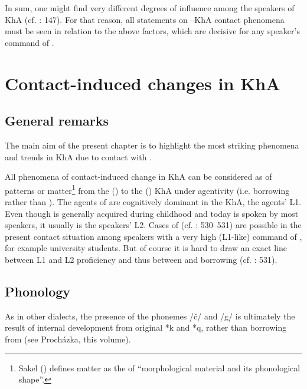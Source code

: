 \documentclass[output=paper,nonflat]{langsci/langscibook}
\begin{document}
In sum, one might find very different degrees of  influence among the speakers of KhA (cf. \citealt{MatrasShabibi2007}: 147). For that reason, all statements on –KhA contact phenomena must be seen in relation to the above factors, which are decisive for any speaker’s command of . 
\largerpage

\section{Contact-induced changes in KhA} 
\subsection{General remarks\footnotemark}
The main aim of the present chapter is to highlight the most striking phenomena and trends in KhA  due to contact with .


All phenomena of contact-induced change in KhA can be considered as  of patterns or matter\footnote{Sakel (\citeyear[15]{Sakel2007}) defines matter  as the  of “morphological material and its phonological shape”.} from the  ()  to the  () KhA under  agentivity (i.e. borrowing rather than ).{} The agents of  are cognitively dominant in the  KhA, the agents’ L1. Even though  is generally acquired during childhood and today is spoken by most speakers, it usually is the speakers’ L2. Cases of  (cf. \citealt{Lucas2015}: 530–531) are possible in the present contact situation among speakers with a very high (L1-like) command of , for example university students. But of course it is hard to draw an exact line between L1 and L2 proficiency and thus between  and borrowing (cf. \citealt{Lucas2015}: 531). 



\subsection{Phonology}
As in other   dialects, the presence of the phonemes /č/ and /g/ is ultimately the result of internal development from original *k and *q, rather than borrowing from  (see Procházka, this volume).
\end{document}
